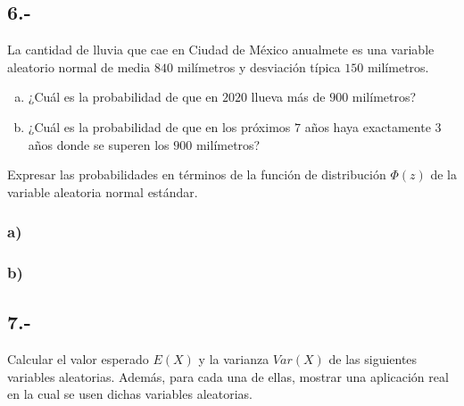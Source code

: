 \documentclass{article}
\begin{document}
\subsection*{6.-}
La cantidad de lluvia que cae en Ciudad de México anualmete es una variable aleatorio normal de media $840$ milímetros y desviación típica $150$ milímetros.
\begin{enumerate}[a)]
    \item ¿Cuál es la probabilidad de que en $2020$ llueva más de $900$ milímetros?
    \item ¿Cuál es la probabilidad de que en los próximos $7$ años haya exactamente $3$ años 
    donde se superen los $900$ milímetros?
\end{enumerate}
Expresar las probabilidades en términos de la función de distribución $\Phi(z)$ de la variable aleatoria 
normal estándar.
\begin{tcolorbox}[breakable]
    \subsubsection*{a)}

    \subsubsection*{b)}
\end{tcolorbox}

\subsection*{7.-}
Calcular el valor esperado $E(X)$ y la varianza $Var(X)$ de las siguientes variables aleatorias. Además, para cada una de ellas, mostrar una aplicación  
real en la cual se usen dichas variables aleatorias.
\end{document}
